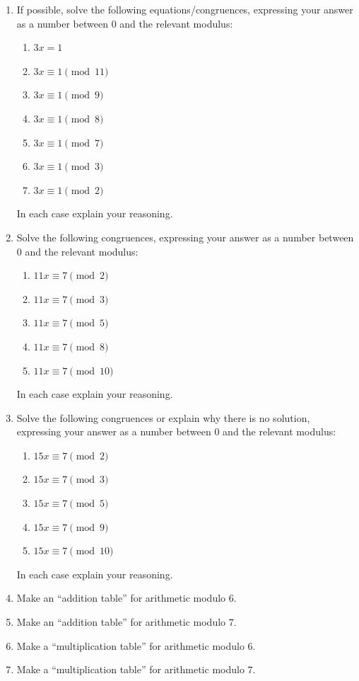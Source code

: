 \begin{problems}
\begin{enumerate}
\item If possible, solve the following equations/congruences,
  expressing your answer as a number between $0$ and the relevant
  modulus:
\begin{enumerate}
\item $3x = 1$
\item $3x \equiv 1 \pmod{11}$
\item $3x \equiv 1 \pmod{9}$
\item $3x \equiv 1 \pmod{8}$
\item $3x \equiv 1 \pmod{7}$
\item $3x \equiv 1 \pmod{3}$
\item $3x \equiv 1 \pmod{2}$
\end{enumerate}
In each case explain your reasoning.
\item Solve the following congruences, expressing your answer as a
  number between $0$ and the relevant modulus:
\begin{enumerate}
\item $11x \equiv 7 \pmod{2}$
\item $11x \equiv 7 \pmod{3}$
\item $11x \equiv 7 \pmod{5}$
\item $11x \equiv 7 \pmod{8}$
\item $11x \equiv 7 \pmod{10}$
\end{enumerate}
In each case explain your reasoning.
\item Solve the following congruences or explain why there is no
  solution, expressing your answer as a number between $0$ and the
  relevant modulus:
\begin{enumerate}
\item $15x \equiv 7 \pmod{2}$
\item $15x \equiv 7 \pmod{3}$
\item $15x \equiv 7 \pmod{5}$
\item $15x \equiv 7 \pmod{9}$
\item $15x \equiv 7 \pmod{10}$
\end{enumerate}
In each case explain your reasoning.
\item Make an ``addition table'' for arithmetic modulo $6$.
\item Make an ``addition table'' for arithmetic modulo $7$.
\item Make a ``multiplication table'' for arithmetic modulo $6$.
\item Make a ``multiplication table'' for arithmetic modulo $7$.


\end{enumerate}
\end{problems}
